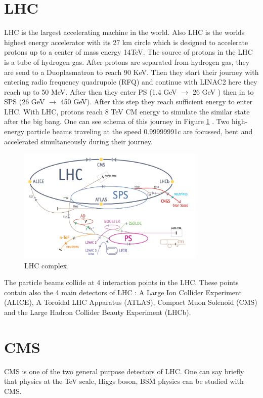 \documentclass[12pt,oneandhalf,chaparabic,phys,ms,eng]{metu}
\begin{document}
\section{LHC}
LHC \cite{R1} is the largest accelerating machine in the world. Also LHC is the worlds highest energy accelerator with its 27 km circle which is designed to accelerate protons up to a center of mass energy 14TeV. The source of protons in the LHC is a tube of hydrogen gas. After protons are separated from hydrogen gas, they are send to a Duoplasmatron to reach 90 KeV. Then they start their journey with entering radio frequency quadrupole (RFQ) and continue with LINAC2 here they reach up to 50 MeV. After then they enter PS (1.4 GeV $\rightarrow$ 26 GeV ) then in to SPS (26 GeV $\rightarrow$ 450 GeV). After this step they reach sufficient energy to enter LHC. With LHC, protons reach 8 TeV CM energy to simulate the similar state after the big bang. One can see schema of this journey in Figure \ref{LHC} . Two high-energy particle beams traveling at the speed 0.99999991c are focussed, bent and accelerated simultaneously during their journey.

\begin{figure}  [!htbptbp]
\centering
    \includegraphics[width=0.8\textwidth]{LHC}
    \caption{\label{LHC}LHC complex. ~\cite{R1}}
\end{figure}

The particle beams collide at 4 interaction points in the LHC. These points contain also the 4 main detectors of LHC : A Large Ion Collider Experiment (ALICE), A Toroidal LHC Apparatus (ATLAS), Compact Muon Solenoid (CMS) and the Large Hadron Collider Beauty Experiment (LHCb). 


\section{CMS}
CMS \cite{R2,R3} is one of the two general purpose detectors of LHC. One can say briefly that physics at the TeV scale, Higgs boson, BSM physics can be studied with CMS. 
\end{document}

